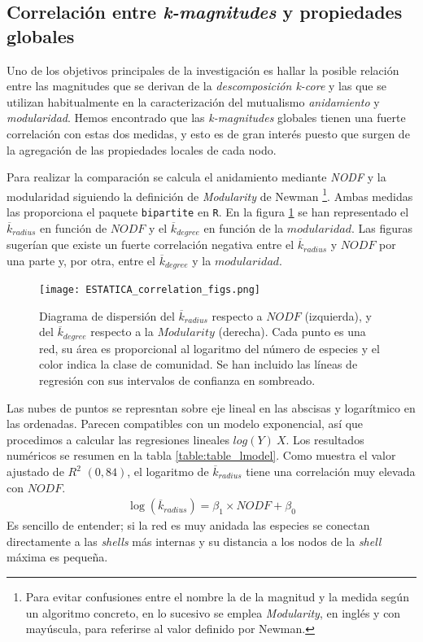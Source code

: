 \subsection{Correlación entre \textit{k-magnitudes} y propiedades globales}

Uno de los objetivos principales de la investigación es hallar la posible relación entre las magnitudes que se derivan de la \textit{descomposición k-core} y las que se utilizan habitualmente en la caracterización del mutualismo \textit{anidamiento} y \textit{modularidad}. Hemos encontrado que las \textit{k-magnitudes} globales tienen una fuerte correlación con estas dos medidas, y esto es de gran interés puesto que surgen de la agregación de las propiedades locales de cada nodo.

Para realizar la comparación se calcula el anidamiento mediante \textit{NODF} y la modularidad siguiendo la definición de \textit{Modularity} de Newman \cite{almeida2008consistent, newman2004finding} \footnote{Para evitar confusiones entre el nombre la de la magnitud y la medida según un algoritmo concreto, en lo sucesivo se emplea \textit{Modularity}, en inglés y con mayúscula, para referirse al valor definido por Newman.}. Ambas medidas las proporciona el paquete \texttt{bipartite} en \texttt{R}. En la figura \ref{fig:ESTATICA_corrfigs} se han representado el $\overline {k}_{radius}$ en función de $NODF$ y el $\overline {k}_{degree}$ en función de la $modularidad$. Las figuras sugerían que existe un fuerte correlación negativa entre el $\overline {k}_{radius}$ y $NODF$ por una parte y, por otra, entre el $\overline {k}_{degree}$ y la $modularidad$. 

\begin{figure}[h!]
\centering
\texttt{[image: ESTATICA\_correlation\_figs.png]}
\caption {Diagrama de dispersión del $\overline {k}_{radius}$ respecto a $NODF$ (izquierda), y del $\overline {k}_{degree}$ respecto a la $Modularity$ (derecha). Cada punto es una red, su área es proporcional al logaritmo del número de especies y el color indica la clase de comunidad. Se han incluido las líneas de regresión con sus intervalos de confianza en sombreado.}
\label{fig:ESTATICA_corrfigs}
\end{figure}

Las nubes de puntos se represntan sobre eje lineal en las abscisas y logarítmico en las ordenadas. Parecen compatibles con un modelo exponencial, así que procedimos a calcular las regresiones lineales $log(Y) ~ X$. Los resultados numéricos se resumen en la tabla \ref{table:table_lmodel}. Como muestra el valor ajustado de $R^2$ $(0,84)$, el logaritmo de $\overline {k}_{radius}$ tiene una correlación muy elevada con $NODF$. 
\begin{align}
\displaystyle \log({\overline k_{radius}}) = \beta_1 \times NODF + \beta_0
\end{align}
\label{eq:kradius_vs_nodf}
Es sencillo de entender; si la red es muy anidada las especies se conectan directamente a las \textit{shells} más internas y su distancia a los nodos de la \textit{shell} máxima es pequeña. 

